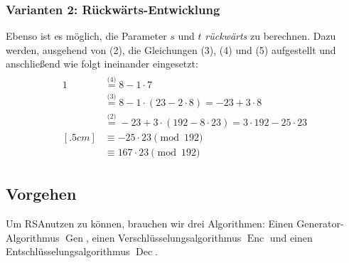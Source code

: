 \begin{beispiel}[EEA]
  \subsubsection*{Varianten 2: Rückwärts-Entwicklung} 
  Ebenso ist es möglich, die Parameter $s$ und $t$ \emph{rückwärts} zu
  berechnen. Dazu werden, ausgehend von (2), die Gleichungen (3), (4) und
  (5) aufgestellt und anschließend wie folgt ineinander eingesetzt:
  \begin{align*}
    \begin{split}
      1 &\stackrel{\textit{(4)}}{=} 8 - 1 \cdot 7\\
        &\stackrel{\textit{(3)}}{=} 8 - 1 \cdot (23 - 2 \cdot 8) = -23 + 3 \cdot 8\\ 
        &\stackrel{\textit{(2)}}{=} -23 + 3 \cdot (192 - 8 \cdot 23) = 3\cdot 192 - 25 \cdot 23\\
 [.5cm] &\equiv -25 \cdot 23 \pmod{192}\\
        &\equiv 167 \cdot 23 \pmod{192}
    \end{split}
  \end{align*}
\end{beispiel}

\subsection{Vorgehen}
\label{ch:asymmenc:rsa:vorgehen} Um RSA\indexRSATextBook nutzen zu
können, brauchen wir drei Algorithmen: Einen Generator-Algorithmus
$\operatorname{Gen}$, einen Verschlüsselungsalgorithmus
$\operatorname{Enc}$ und einen Entschlüsselungsalgorithmus
$\operatorname{Dec}$.
